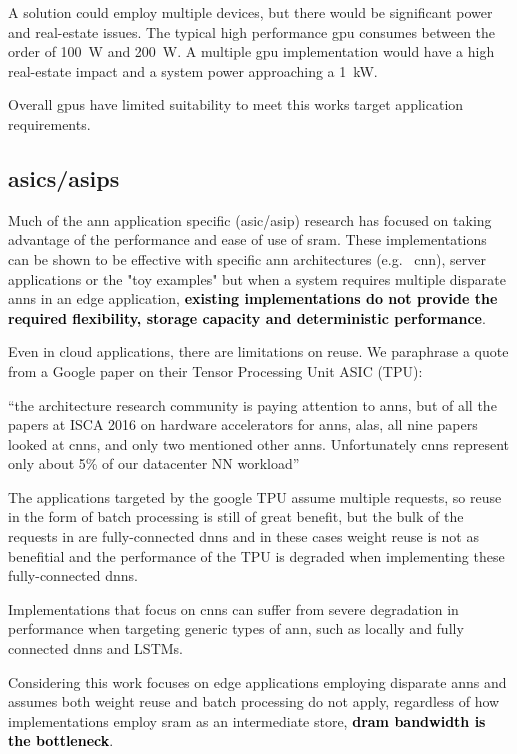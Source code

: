 A solution could employ multiple devices, but there would be significant power and real-estate issues. 
The typical high performance \ac{gpu} consumes between the order of \SI{100}{\watt} and \SI{200}{\watt}.
A multiple \ac{gpu} implementation would have a high real-estate impact and a system power approaching a \SI[per-mode=symbol]{1}{\kilo \watt}.

Overall \acp{gpu} have limited suitability to meet this works target application requirements.


\subsection{\Acp{asic}/\Acp{asip}}
\label{sec:asicAndAsip}
Much of the \ac{ann} application specific (\ac{asic}/\ac{asip}) research has focused on taking advantage of the performance and ease of use of \acf{sram}.
These implementations can be shown to be effective with specific \ac{ann} architectures (e.g. \ \ac{cnn}), server applications or the "toy examples" but when a system requires multiple disparate \ac{ann}s in an edge application, \textbf{\textcolor{black}{existing implementations do not provide the required flexibility, storage capacity and deterministic performance}}.

Even in cloud applications, there are limitations on reuse. We paraphrase a quote from a Google paper \cite{tensorflow2015-whitepaper} on their Tensor Processing Unit ASIC (TPU):

\hyphenquote{american}{the architecture research community is paying attention to \acp{ann}, but of all the papers at ISCA 2016 on hardware accelerators for \acp{ann}, alas, all nine papers looked at \ac{cnn}s, and only two mentioned other \acp{ann}. 
Unfortunately \ac{cnn}s represent only about 5\% of our datacenter NN workload}

The applications targeted by the google TPU \cite{tensorflow2015-whitepaper} assume multiple requests, so reuse in the form of batch processing is still of great benefit, but the bulk of the requests in \cite{tensorflow2015-whitepaper} are fully-connected \ac{dnn}s and in these cases weight reuse is not as benefitial and the performance of the TPU is degraded when implementing these fully-connected \ac{dnn}s.

Implementations that focus on \ac{cnn}s can suffer from severe degradation in performance when targeting generic types of \ac{ann}, such as locally and fully connected \ac{dnn}s and LSTMs.

Considering this work focuses on edge applications employing disparate \ac{ann}s and assumes both weight reuse and batch processing do not apply, regardless of how implementations employ \ac{sram} as an intermediate store, \textbf{\textcolor{black}{\ac{dram} bandwidth is the bottleneck}}.




